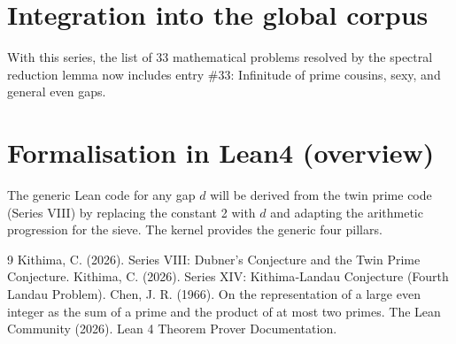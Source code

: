 \documentclass[11pt,a4paper]{article}
\begin{document}
\section{Integration into the global corpus}

With this series, the list of 33 mathematical problems resolved by the spectral reduction lemma now includes entry \#33: Infinitude of prime cousins, sexy, and general even gaps.

\section{Formalisation in Lean4 (overview)}

The generic Lean code for any gap \(d\) will be derived from the twin prime code (Series VIII) by replacing the constant 2 with \(d\) and adapting the arithmetic progression for the sieve. The kernel provides the generic four pillars.


\begin{thebibliography}{9}
  Kithima, C. (2026). Series VIII: Dubner's Conjecture and the Twin Prime Conjecture.
  Kithima, C. (2026). Series XIV: Kithima‑Landau Conjecture (Fourth Landau Problem).
  Chen, J. R. (1966). On the representation of a large even integer as the sum of a prime and the product of at most two primes.
  The Lean Community (2026). Lean 4 Theorem Prover Documentation.
\end{thebibliography}
\end{document}
